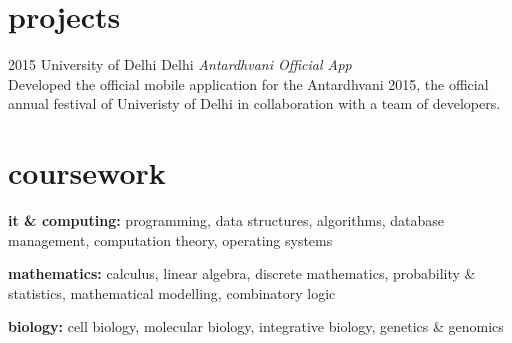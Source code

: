 \documentclass[]{devkhan-cv} %
\begin{document}

\section{projects}
	\begin{entrylist}

		\entry
			{2015}
			{University of Delhi}
			{Delhi}
			{\emph{Antardhvani Official App} \\
			Developed the official mobile application for the Antardhvani 2015, the official annual festival of Univeristy of Delhi in collaboration with a team of developers.}

	\end{entrylist}


\section{coursework}
	\begin{entrylist}

		\entry
			{\textbf{it \& computing:}}
			{}{}{programming, data structures, algorithms, database management, computation	theory, operating systems}

		\entry
			{\textbf{mathematics:}}
			{}{}{calculus, linear algebra, discrete mathematics, probability \& statistics, mathematical modelling, combinatory logic}

		\entry
			{\textbf{biology:}}
			{}{}{cell biology, molecular biology, integrative biology, genetics \& genomics}

	\end{entrylist}
\end{document}
